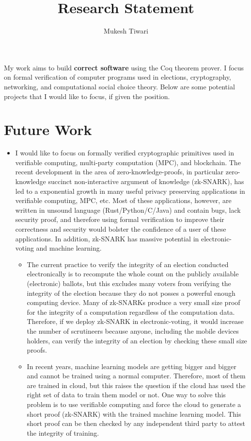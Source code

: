 \documentclass[a4paper]{article}
\title{Research Statement}
\author{Mukesh Tiwari}
\date{}
\begin{document}
\fontsize{11}{15}
\selectfont
\maketitle

My work aims to build \textbf{correct software} 
using the Coq theorem prover. 
I focus on formal verification of computer programs used in elections, cryptography, 
networking, and computational social choice theory. Below are some potential projects 
that I would like to focus, if given the position.


\section{Future Work}
\begin{itemize}
    \item I would like to focus 
	on formally verified cryptographic primitives used in
	verifiable computing, multi-party computation (MPC), and blockchain. 
    The recent development in the 
	area of zero-knowledge-proofs, in particular 
	zero-knowledge succinct non-interactive argument of knowledge (zk-SNARK), 
	has led to a exponential growth in many useful 
	privacy preserving applications in verifiable computing, MPC, etc. Most of these 
	applications, however, are written 
	in unsound language (Rust/Python/C/Java) and contain bugs,
	lack security proof, and therefore using formal verification 
	to improve their correctness and security would bolster the 
	confidence of a user of these applications.
	In addition, zk-SNARK has massive potential in electronic-voting and machine learning. 
	\begin{itemize}
		\item The current practice to verify the integrity of an election conducted electronically is to 
		recompute the whole count on the publicly available (electronic) ballots, but 
		this excludes many voters from verifying the integrity of the election because 
		they do not posses a powerful enough computing device. Many of 
		zk-SNARKs produce a very small size proof for the integrity of a computation 
		regardless of the computation data. Therefore, if we deploy zk-SNARK in 
		electronic-voting, it would 
		increase the number of scrutineers because anyone, including the 
		mobile devices holders, can verify the integrity of an election 
		by checking these small size proofs. 
		\item In recent years, 
   machine learning models are getting bigger and bigger and cannot be trained using a normal computer. 
   Therefore, most of them are trained in cloud, but this 
   raises the question if the cloud has used the right set of data to train them model or not. 
   One way to solve this problem is to use verifiable computing and force the cloud to generate a short proof (zk-SNARK)
   with the trained machine learning model. 
   This short proof can be then checked by any independent third party to attest the 
   integrity of training. 



\end{itemize}
\end{itemize}
\end{document}
